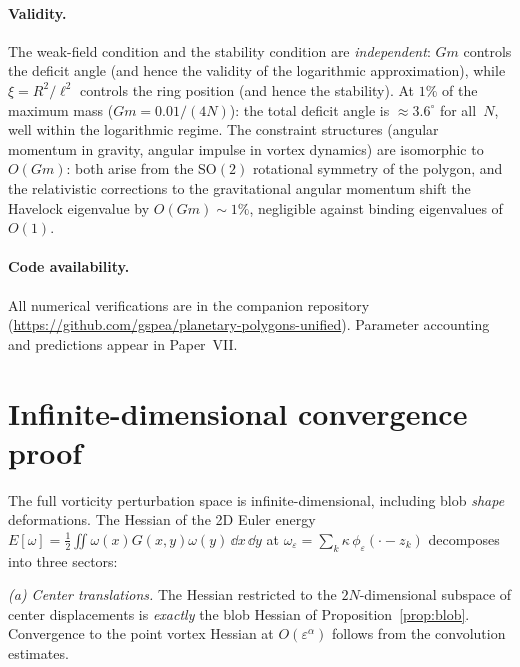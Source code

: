 \paragraph{Validity.}
The weak-field condition and the stability condition are
\emph{independent}: $Gm$ controls the deficit angle
(and hence the validity of the logarithmic approximation),
while $\xi = R^2/\ell^2$ controls the ring position
(and hence the stability).
At $1\%$ of the maximum mass ($Gm = 0.01/(4N)$): the total
deficit angle is $\approx 3.6^\circ$ for all~$N$, well within
the logarithmic regime.
The constraint structures (angular momentum in gravity,
angular impulse in vortex dynamics) are isomorphic to
$O(Gm)$: both arise from the SO$(2)$ rotational symmetry
of the polygon, and the relativistic corrections to the
gravitational angular momentum shift the Havelock eigenvalue
by $O(Gm) \sim 1\%$, negligible against binding eigenvalues
of $O(1)$.



\paragraph{Code availability.}
All numerical verifications are in the companion repository
(\url{https://github.com/gspea/planetary-polygons-unified}).
Parameter accounting and predictions appear in Paper~VII.

\appendix
\section{Infinite-dimensional convergence proof}
\label{app:convergence}

The full vorticity perturbation space is
infinite-dimensional, including blob \emph{shape} deformations.
The Hessian of the 2D Euler energy
$E[\omega] = \tfrac12\iint\omega(x)G(x,y)\omega(y)\,\dd x\,\dd y$ at
$\omega_\varepsilon = \sum_k \kappa\,\phi_\varepsilon(\cdot - z_k)$
decomposes into three sectors:

\emph{(a) Center translations.}  The Hessian restricted to the
$2N$-dimensional subspace of center displacements is \emph{exactly}
the blob Hessian of Proposition~\ref{prop:blob}.  Convergence to the
point vortex Hessian at $O(\varepsilon^\alpha)$ follows from the
convolution estimates.

